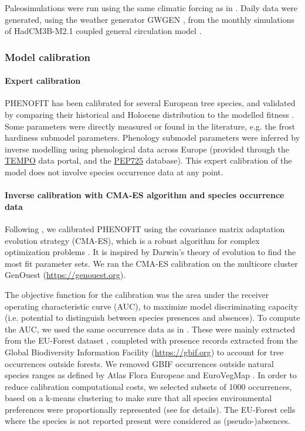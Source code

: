 Paleosimulations were run using the same climatic forcing as in \citet{VanderMeersch2024}. Daily data were generated, using the weather generator GWGEN \citep{Sommer2017}, from the monthly simulations of HadCM3B-M2.1 coupled general circulation model \citep{Armstrong2019}.

\subsubsection{Model calibration}

\paragraph{Expert calibration}

PHENOFIT has been calibrated for several European tree species, and validated  by comparing their historical and Holocene distribution to the modelled fitness  \citep{Saltre2013, Duputie2015, Gauzere2020, VanderMeersch2024}. Some parameters were directly measured or found in the literature, e.g. the frost hardiness submodel parameters. Phenology submodel parameters were inferred by inverse modelling using phenological data across Europe (provided through the 
\href{https://data.pheno.fr}{TEMPO} data portal, and the \href{https://pep725.eu}{PEP725} database). %
This expert calibration of the model does not involve species occurrence data at any point.

\paragraph{Inverse calibration with CMA-ES algorithm and species occurrence data}

Following \citet{VanderMeersch2023}, we calibrated PHENOFIT using the covariance matrix adaptation evolution strategy (CMA-ES), which  is a robust algorithm for complex optimization problems \citep{Hansen2001}. It is inspired by Darwin's theory of evolution to find the most fit parameter sets. We ran the CMA-ES calibration on the multicore cluster GenOuest (\url{https://genouest.org}).

The objective function for the calibration was the area under the receiver operating characteristic curve (AUC), to maximize model discriminating capacity (i.e. potential to distinguish between species presences and absences). To compute the AUC, we used the same occurrence data as in \citep{VanderMeersch2023}. These were mainly extracted from the EU-Forest dataset \citep{Mauri2017}, completed with presence records extracted from the Global Biodiversity Information Facility (\url{https://gbif.org}) to account for tree occurrences outside forests. We removed GBIF occurrences outside natural species ranges as defined by Atlas Flora Europeae \citep{AFE2005} and EuroVegMap \citep{EVM2003}. In order to reduce calibration computational costs, we selected subsets of 1000 occurrences,  based on a k-means clustering to make sure that all species environmental preferences were proportionally represented (see \citet{VanderMeersch2023} for details). The EU-Forest cells where the species is not reported present were considered as (pseudo-)absences.

